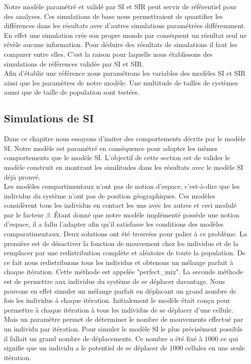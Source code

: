 Notre modèle paramétré et validé par SI et SIR peut servir de référentiel pour des analyses. Ces simulations de base nous permettraient de quantifier les différences dans les résultats avec d'autres simulations paramétrées différemment. En effet une simulation crée son propre monde par conséquent un résultat seul ne révèle aucune information. Pour déduire des résultats de simulations il faut les comparer entre elles. C'est la raison pour laquelle nous établissons des simulations de références validée par SI et SIR.\\

Afin d'établir une référence nous paramétrons les variables des modèles SI et SIR ainsi que les paramètres de notre modèle. Une multitude de tailles de systèmes aunsi que de taille de population sont testées.\\

\subsection{Simulations de SI}

Dans ce chapitre nous essayons d'imiter des comportements décrits par le modèle SI. Notre modèle est paramétré en conséquence pour adopter les mêmes comportements que le modèle SI. L'objectif de cette section est de valider le modèle construit en montrant les similitudes dans les résultats avec le modèle SI déjà prouvé. \\

Les modèles compartimentaux n'ont pas de notion d'espace, c'est-à-dire que les individus du système n'ont pas de position géographiques. Ces modèles considèrent tous les individus en contact les uns avec les autres et ceci modulé par le facteur $\beta$. Étant donné que notre modèle implémenté possède une notion d'espace, il a fallu l'adapter afin qu'il satisfasse les conditions des modèles comparatimentaux. Deux solutions ont été trouvées pour palier à ce problème. La première est de désactiver la fonction de mouvement chez les individus et de la remplacer par une redistribution complète et aléatoire de toute la population. De ce fait nous redistribuons tous les individus et obtenons un mélange parfait à chaque itération. Cette méthode est appelée "perfect\_mix". La seconde méthode est de permettre aux individus du système de se déplacer davantage. Nous pouvons en effet simuler un mélange parfait en déplacant un grand nombre de fois les individus à chaque itération. Initialement le modèle était conçu pour permettre à chaque itération à tous les individus de se déplacer d'une cellule. Mais un paramètre permet de déterminer le nombre de mouvements effectué par un individu par itération. Pour simuler le modèle SI le plus précisément possible il fallait un grand nombre de déplacements. Ce nombre a été fixé à $1000$ ce qui signifie que un individu a le potentiel de se déplacer de $1000$ cellules en une seule itération.\\


